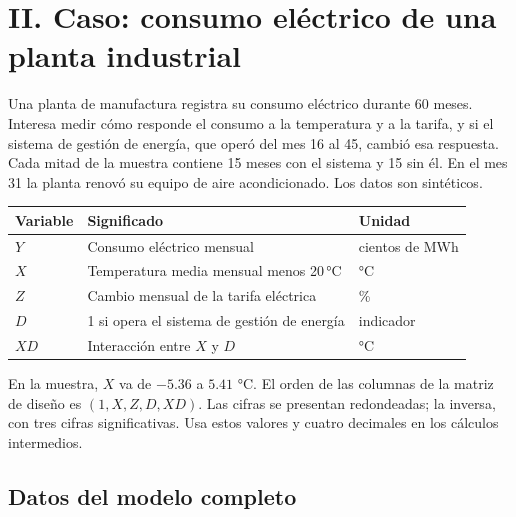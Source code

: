 \section*{II. Caso: consumo eléctrico de una planta industrial}

Una planta de manufactura registra su consumo eléctrico durante 60 meses. Interesa medir cómo responde el consumo a la temperatura y a la tarifa, y si el sistema de gestión de energía, que operó del mes 16 al 45, cambió esa respuesta. Cada mitad de la muestra contiene 15 meses con el sistema y 15 sin él. En el mes 31 la planta renovó su equipo de aire acondicionado. Los datos son sintéticos.

\begin{center}
\begin{tabular}{@{}lll@{}}
\toprule
Variable & Significado & Unidad\\
\midrule
$Y$ & Consumo eléctrico mensual & cientos de MWh\\
$X$ & Temperatura media mensual menos 20\,°C & °C\\
$Z$ & Cambio mensual de la tarifa eléctrica & \%\\
$D$ & 1 si opera el sistema de gestión de energía & indicador\\
$XD$ & Interacción entre $X$ y $D$ & °C\\
\bottomrule
\end{tabular}
\end{center}

En la muestra, $X$ va de $-5.36$ a $5.41$ °C. El orden de las columnas de la matriz de diseño es $(1,X,Z,D,XD)$. Las cifras se presentan redondeadas; la inversa, con tres cifras significativas. Usa estos valores y cuatro decimales en los cálculos intermedios.

\subsection*{Datos del modelo completo}

